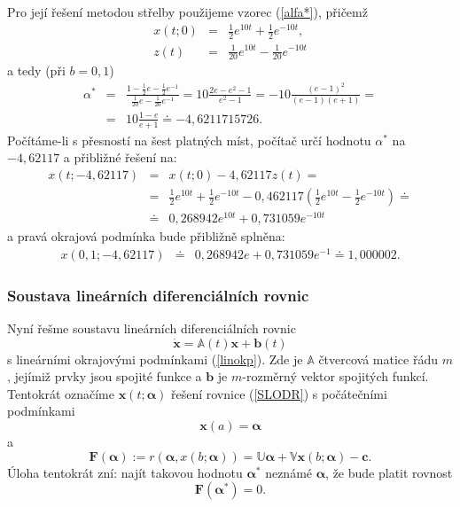 \documentclass[a4paper, 12pt]{book}
\theoremstyle{definition}
\def\vc#1{\mathbf{\boldsymbol{#1}}}     %
\def\tn#1{{\mathbb{#1}}}    %
\begin{document}
Pro její řešení metodou střelby použijeme vzorec (\ref{alfa*}), přičemž
\begin{eqnarray*}
x(t;0)&=&\frac 12 e^{10t}+\frac 12 e^{-10t},\\
z(t)&=&\frac 1{20}e^{10t}-\frac 1{20}e^{-10t}
\end{eqnarray*}
a tedy (při $b=0{,}1$)
\begin{eqnarray*}
\alpha^*&=&\frac{1-\frac 12 e-\frac 12 e^{-1}}{\frac 1{20}e-\frac 1{20}e^{-1}}
=10\frac{2e-e^2-1}{e^2-1}=-10\frac{(e-1)^2}{(e-1)(e+1)}=\\
 &=& 10\frac{1-e}{e+1}\doteq-4{,}6211715726.
\end{eqnarray*}
Počítáme-li s přesností na šest platných míst, počítač určí hodnotu
$\alpha^*$ na $-4{,}62117$ a přibližné řešení na:
\begin{eqnarray*}
x(t;-4{,}62117)&=&x(t;0)-4{,}62117 z(t) = \\
&=&\frac 12 e^{10t}+\frac 12 e^{-10t}-0{,}462117(\frac 12 e^{10t}-\frac 12 e^{-10t})\doteq\\
&\doteq& 0{,}268942 e^{10t} + 0{,}731059 e^{-10t}
\end{eqnarray*}
a pravá okrajová podmínka bude přibližně splněna:
\begin{eqnarray*}
x(0{,}1;-4{,}62117)&\doteq& 0{,}268942 e + 0{,}731059 e^{-1}
\doteq 1{,}000002.
\end{eqnarray*}

\subsubsection{Soustava lineárních diferenciálních rovnic}
Nyní řešme soustavu lineárních diferenciálních rovnic
\begin{equation}\label{SLODR}
\dot{\vc x}={\tn A}(t)\vc x+\vc b(t)
\end{equation}
s lineárními okrajovými podmínkami (\ref{linokp}). Zde je $\tn A$ čtvercová
matice řádu $m$, jejímiž prvky jsou spojité funkce a $\vc b$ je $m$-rozměrný
vektor spojitých funkcí. Tentokrát označíme $\vc x(t;\vc\alpha)$ řešení rovnice 
(\ref{SLODR}) s počátečními podmínkami
\begin{displaymath}
\vc x(a)=\vc\alpha
\end{displaymath}
a 
\begin{displaymath}
\vc F(\vc\alpha):=r(\vc\alpha,x(b;\vc\alpha))={\tn U}\vc\alpha+{\tn V}\vc x(b;\vc\alpha)-\vc c.
\end{displaymath}
Úloha tentokrát zní: najít takovou hodnotu $\vc\alpha^*$ neznámé $\vc\alpha$, že bude platit
rovnost
\begin{equation}\label{linokpmetstr}
\vc F(\vc\alpha^*)=0.
\end{equation}
\end{document}
